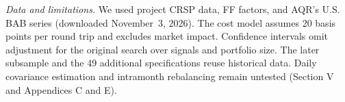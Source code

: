 \documentclass[11pt,a4paper]{article}
\begin{document}
\textit{Data and limitations.} We used project CRSP data, FF factors, and AQR's U.S. BAB series (downloaded November~3, 2026). The cost model assumes 20 basis points per round trip and excludes market impact. Confidence intervals omit adjustment for the original search over signals and portfolio size. The later subsample and the 49 additional specifications reuse historical data. Daily covariance estimation and intramonth rebalancing remain untested (Section V and Appendices C and E).
\end{document}
